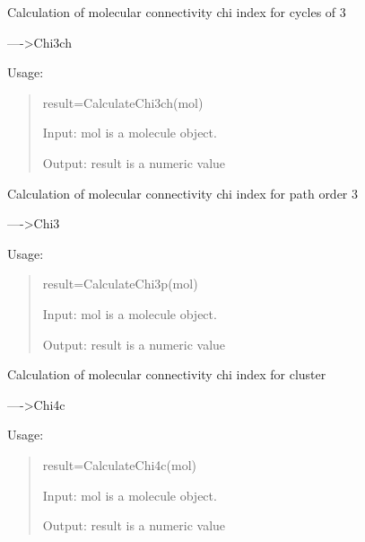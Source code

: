 \documentclass[letterpaper,10pt,english]{sphinxmanual}
\begin{document}

\begin{fulllineitems}
\label{reference/connectivity:connectivity.CalculateChi3ch}
Calculation of molecular connectivity chi index for cycles of 3

----\textgreater{}Chi3ch

Usage:
\begin{quote}

result=CalculateChi3ch(mol)

Input: mol is a molecule object.

Output: result is a numeric value
\end{quote}

\end{fulllineitems}


\begin{fulllineitems}
\label{reference/connectivity:connectivity.CalculateChi3p}
Calculation of molecular connectivity chi index for path order 3

----\textgreater{}Chi3

Usage:
\begin{quote}

result=CalculateChi3p(mol)

Input: mol is a molecule object.

Output: result is a numeric value
\end{quote}

\end{fulllineitems}


\begin{fulllineitems}
\label{reference/connectivity:connectivity.CalculateChi4c}
Calculation of molecular connectivity chi index for cluster

----\textgreater{}Chi4c

Usage:
\begin{quote}

result=CalculateChi4c(mol)

Input: mol is a molecule object.

Output: result is a numeric value
\end{quote}

\end{fulllineitems}
\end{document}
